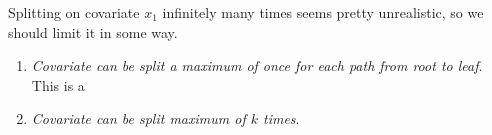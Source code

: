   \begin{example}
    Splitting on covariate $x_1$ infinitely many times seems pretty unrealistic, so we should limit it in some way. 
    \begin{enumerate}
      \item \textit{Covariate can be split a maximum of once for each path from root to leaf}. This is a 
      \item \textit{Covariate can be split maximum of $k$ times}. 
    \end{enumerate}
  \end{example}

  \begin{example}
    
  \end{example} 

  \begin{example}
    
  \end{example}
